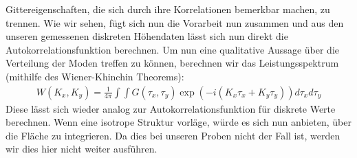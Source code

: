 Gittereigenschaften, die sich durch ihre Korrelationen bemerkbar machen, zu trennen.
Wie wir sehen, fügt sich nun die Vorarbeit nun zusammen und 
aus den unseren gemessenen diskreten Höhendaten lässt  
sich nun direkt die Autokorrelationsfunktion
berechnen. 
Um nun eine qualitative Aussage über die Verteilung der Moden
treffen zu können, berechnen wir das Leistungsspektrum (mithilfe
des Wiener-Khinchin Theorems):
\begin{align}
    W(K_x,K_y)=\frac{1}{4\pi}\int\int G(\tau_x,\tau_y)\exp(-i(K_x\tau_x+K_y\tau_y)) d\tau_xd\tau_y
\end{align}
Diese lässt sich wieder analog zur Autokorrelationsfunktion
für diskrete Werte berechnen. Wenn eine isotrope Struktur
vorläge, würde es sich nun anbieten, über die Fläche zu 
integrieren. Da dies bei unseren Proben nicht der Fall ist,
werden wir dies hier nicht weiter ausführen.\\

